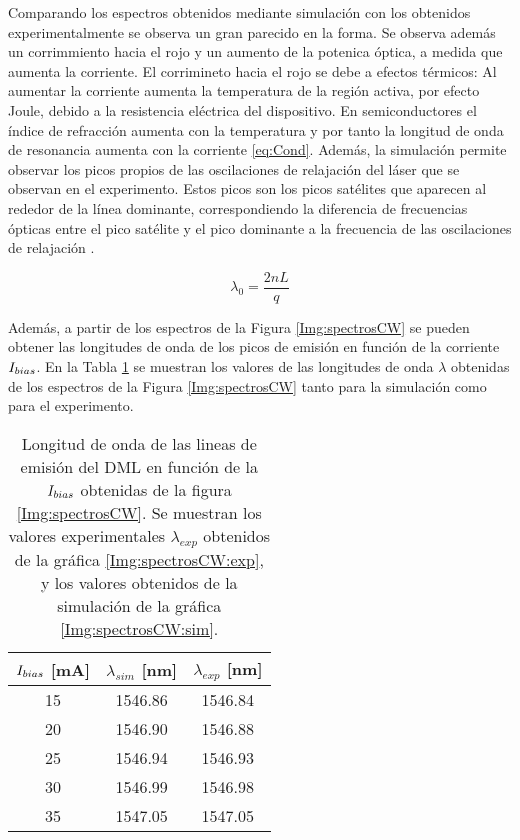 		Comparando los espectros obtenidos mediante simulación con los obtenidos experimentalmente se observa un gran parecido en la forma. Se observa además un corrimmiento hacia el rojo y un aumento de la potenica óptica, a medida que aumenta la corriente. El corrimineto hacia el rojo se debe a efectos térmicos: Al aumentar la corriente aumenta la temperatura de la región activa, por efecto Joule, debido a la resistencia eléctrica del dispositivo. En semiconductores el índice de refracción aumenta con la temperatura y por tanto la longitud de onda de resonancia aumenta con la corriente \ref{eq:Cond}. Además, la simulación permite observar los picos propios de las oscilaciones de relajación del láser que se observan en el experimento. Estos picos son los picos satélites que aparecen al rededor de la línea dominante, correspondiendo la diferencia de frecuencias ópticas entre el pico satélite y el pico dominante a la frecuencia de las oscilaciones de relajación \cite{van1995semiconductor}.

			\begin{equation}
				\lambda_0 = \frac{2nL}{q}
				\label{eq:Cond}
			\end{equation}

		Además, a partir de los espectros de la Figura \ref{Img:spectrosCW} se pueden obtener las longitudes de onda de los picos de emisión en función de la corriente $I_{bias}$. En la Tabla \ref{tab:lambdas} se muestran los valores de las longitudes de onda $\lambda$ obtenidas de los espectros de la Figura \ref{Img:spectrosCW} tanto para la simulación como para el experimento.

		\begin{table}[H]
			\centering
			\begin{tabular}{c c c}
				\hline
				$I_{bias}$ [mA] & $\lambda_{sim}$ [nm] & $\lambda_{exp}$ [nm] \\\hline 
				15 & 1546.86 & 1546.84 \\
				20 & 1546.90 & 1546.88 \\
				25 & 1546.94 & 1546.93 \\
				30 & 1546.99 & 1546.98 \\
				35 & 1547.05 & 1547.05 \\\hline
			\end{tabular}
			\caption{\label{tab:lambdas}Longitud de onda de las lineas de emisión del DML en función de la $I_{bias}$ obtenidas de la figura \ref{Img:spectrosCW}. Se muestran los valores experimentales $\lambda_{exp}$ obtenidos de la gráfica \ref{Img:spectrosCW:exp}, y los valores obtenidos de la simulación de la gráfica \ref{Img:spectrosCW:sim}.}
		\end{table}

